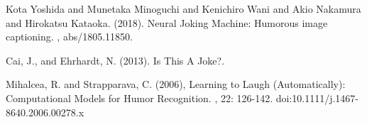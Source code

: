 \documentclass[twoside,twocolumn]{article}
\begin{document}
\begin{thebibliography}{99} %


Kota Yoshida and Munetaka Minoguchi and Kenichiro Wani and Akio Nakamura and Hirokatsu Kataoka. (2018).
\newblock Neural Joking Machine: Humorous image captioning.
, abs/1805.11850.

Cai, J., and Ehrhardt, N. (2013). 
\newblock Is This A Joke?.

Mihalcea, R. and Strapparava, C. (2006), 
\newblock Learning to Laugh (Automatically): Computational Models for Humor Recognition.
, 22: 126-142. doi:10.1111/j.1467-8640.2006.00278.x
 
\end{thebibliography}

\end{document}
